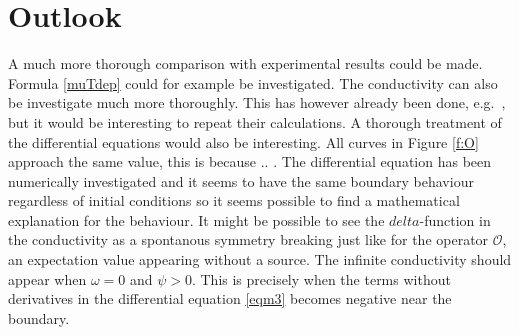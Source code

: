 \documentclass[12pt]{report}
\begin{document}
\section{Outlook}
A much more thorough comparison with experimental results could be made. Formula \eqref{muTdep} could for example be investigated. The conductivity can also be investigate much more thoroughly. This has however already been done, e.g.~\cite{hartnoll8}, but it would be interesting to repeat their calculations. A thorough treatment of the differential equations would also be interesting. All curves in Figure \ref{f:O} approach the same value, this is because .. . The differential equation has been numerically investigated and it seems to have the same boundary behaviour regardless of initial conditions so it seems possible to find a mathematical explanation for the behaviour. It might be possible to see the $delta$-function in the conductivity as a spontanous symmetry breaking just like for the operator $\mathcal{O}$, an expectation value appearing without a source. The infinite conductivity should appear when $\omega=0$ and $\psi>0$. This is precisely when the terms without derivatives in the differential equation \eqref{eqm3} becomes negative near the boundary.
\end{document}
